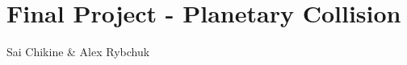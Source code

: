 \documentclass[12pt]{article}
\newcommand{\pdfgraphics}{\ifpdf\DeclareGraphicsExtensions{.pdf,.jpg}\else\fi}
\begin{document}

\section*{Final Project - Planetary Collision}  %

\medskip
\noindent %
Sai Chikine \& Alex Rybchuk
\end{document}
